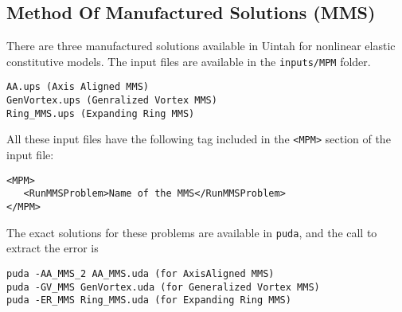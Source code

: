 \subsection{Method Of Manufactured Solutions (MMS)}
There are three manufactured solutions available in Uintah for nonlinear elastic constitutive models. The input files are available in the {\tt inputs/MPM} folder. 
\begin{verbatim}
AA.ups (Axis Aligned MMS)
GenVortex.ups (Genralized Vortex MMS)
Ring_MMS.ups (Expanding Ring MMS)
\end{verbatim}
All these input files have the following tag included in the {\tt <MPM>} section of the input file:
\begin{verbatim}
<MPM>
   <RunMMSProblem>Name of the MMS</RunMMSProblem>	
</MPM>
\end{verbatim}
The exact solutions for these problems are available in {\tt puda}, and the call to extract the error is
\begin{verbatim}
puda -AA_MMS_2 AA_MMS.uda (for AxisAligned MMS)
puda -GV_MMS GenVortex.uda (for Generalized Vortex MMS)
puda -ER_MMS Ring_MMS.uda (for Expanding Ring MMS)
\end{verbatim}

